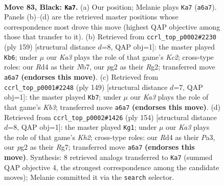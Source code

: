 \documentclass[11pt]{article}
\begin{document}
\clearpage

\begin{figure}[p]\centering
\begin{subfigure}{0.46\textwidth}\centering
\resizebox{\linewidth}{!}{%
\newchessgame
\chessboard[
  setfen={8/8/k4K2/8/3r4/1R6/1N4P1/8 b - - 31 83},
  showmover=false,
  pgfstyle=straightmove, color=movearrow, markmove={a6-a7}
]}
\caption{}
\end{subfigure}\hfill
\begin{subfigure}{0.46\textwidth}\centering
\resizebox{\linewidth}{!}{%
\newchessgame
\chessboard[
  setfen={8/1nk5/8/8/K7/8/6r1/1N1R4 b - - 14 80},
  showmover=false,
  pgfstyle=straightmove, color=movearrow, markmove={c7-b6}
]}
\caption{}
\end{subfigure}
\\[4pt]
\begin{subfigure}{0.46\textwidth}\centering
\resizebox{\linewidth}{!}{%
\newchessgame
\chessboard[
  setfen={8/8/1k2K3/5N2/1p6/7r/5R2/8 b - - 8 75},
  showmover=false,
  pgfstyle=straightmove, color=movearrow, markmove={b6-b7}
]}
\caption{}
\end{subfigure}\hfill
\begin{subfigure}{0.46\textwidth}\centering
\resizebox{\linewidth}{!}{%
\newchessgame
\chessboard[
  setfen={5r2/6R1/8/8/5n2/P4k2/7K/8 w - - 20 78},
  showmover=false,
  pgfstyle=straightmove, color=movearrow, markmove={h2-g1}
]}
\caption{}
\end{subfigure}
\caption{\textbf{Move 83, Black: \texttt{Ka7}.} (a) Our position; Melanie plays \texttt{Ka7} (\texttt{a6a7}). Panels (b)--(d) are the retrieved master positions whose correspondence most drove this move (highest QAP objective among those that transfer to it). (b) Retrieved from \texttt{ccrl\_top\_p0002\#2230} (ply 159) [structural distance $d$=8, QAP obj=1]: the master played \texttt{Kb6}; under $\mu$ our \emph{Ka3} plays the role of that game's \emph{Kc2}; cross-type roles: our \emph{R}d4 as their \emph{N}b7, our \emph{p}g2 as their \emph{R}g2; transferred move \texttt{a6a7} \textbf{(endorses this move)}. (c) Retrieved from \texttt{ccrl\_top\_p0001\#2248} (ply 149) [structural distance $d$=7, QAP obj=1]: the master played \texttt{Kb7}; under $\mu$ our \emph{Ka3} plays the role of that game's \emph{Kb3}; transferred move \texttt{a6a7} \textbf{(endorses this move)}. (d) Retrieved from \texttt{ccrl\_top\_p0002\#1426} (ply 154) [structural distance $d$=8, QAP obj=1]: the master played \texttt{Kg1}; under $\mu$ our \emph{Ka3} plays the role of that game's \emph{Kh2}; cross-type roles: our \emph{R}d4 as their \emph{P}a3, our \emph{p}g2 as their \emph{R}g7; transferred move \texttt{a6a7} \textbf{(endorses this move)}. Synthesis: 8 retrieved analogs transferred to \texttt{Ka7} (summed QAP objective 4, the strongest correspondence among the candidate moves); Melanie committed it via the \texttt{search} selector.}
\label{fig:thought-m165}
\end{figure}
\end{document}
